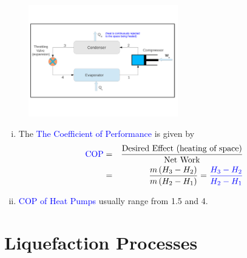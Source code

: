 \documentclass[10pt,compress]{beamer}
\newcommand{\frc}{\displaystyle\frac}
\begin{document}
\begin{frame}
 \frametitle{}
    \begin{figure}%
     \begin{center}
      \includegraphics[width=6.5cm,clip]{./Pics/Overview_Refrig36}
     \end{center}
    \end{figure} 


  \begin{enumerate}[(i)]
   \item <1-> The \textcolor{blue}{The Coefficient of Performance} is given by
    \begin{eqnarray}
     \textcolor{blue}{\text{COP}} &=& \frc{\text{Desired Effect (heating of space)}}{\text{Net Work}} \nonumber \\
                                  &=& \frc{m\left(H_{3}-H_{2}\right)}{m\left(H_{2}-H_{1}\right)} = \textcolor{blue}{\frc{H_{3}-H_{2}}{H_{2}-H_{1}}}\nonumber
    \end{eqnarray}
   \item <2-> \textcolor{blue}{COP of Heat Pumps} usually range from 1.5 and 4.
  \end{enumerate}
\end{frame}



\section{Liquefaction Processes}
\end{document}
